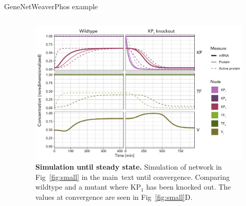 \begin{frame}{GeneNetWeaverPhos example}

\begin{columns}
\begin{column}{0.3\textwidth}
\end{column}
\begin{column}{0.7\textwidth}
\begin{figure}[ht]
    \centering
    \includegraphics[width=\linewidth]{methods/fig/simulation_KP1_v4.pdf}
    \caption{{\bf Simulation until steady state.}
    Simulation of network in Fig~\ref{fig:small} in the main~text until convergence. 
    Comparing wildtype and a mutant where $\text{KP}_1$ has been knocked out. The values at convergence are seen in Fig~\ref{fig:small}D.
    }
     \label{fig:simulation}
\end{figure}
\end{column}
\end{columns}

\end{frame}


